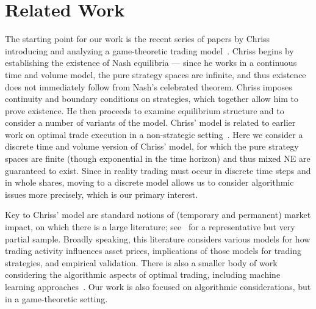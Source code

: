\section{Related Work}
The starting point for our work is the recent series of papers by Chriss introducing and analyzing a game-theoretic trading model~\citep{chriss2024optimal,chriss2024positionbuildingcompetitionrealworldconstraints,chriss2024competitiveequilibriatrading, chriss2025positionbuildingcompetitiongame}. Chriss begins by establishing the existence of Nash equilibria --- since he works in a continuous time and volume model, the pure strategy spaces are infinite, and thus existence does not immediately follow from Nash's celebrated theorem. Chriss imposes continuity and boundary conditions on strategies, which together allow him to prove existence. He then proceeds to examine equilibrium structure and to consider a number of variants of the model. 
Chriss' model is related to earlier work on optimal trade execution in a non-strategic setting~\citep{AlmgrenPortfolio}.
Here we consider a discrete time and volume version of Chriss' model, for which the pure strategy spaces are finite (though exponential in the time horizon) and thus mixed NE are guaranteed to exist. Since in reality trading must occur in discrete time steps and in whole shares, moving to a discrete model allows us to consider algorithmic issues more precisely, which is our primary interest.

Key to Chriss' model are standard notions of (temporary and permanent) market impact, on which there is a large literature;
see~\citep{Gatheral3Models,GatheralMI,Hautsch,Zarinelli,bouchaud,Webster} for a representative but very partial sample. Broadly speaking, this literature considers various models for how trading activity influences asset prices, implications of those models for trading strategies, and empirical validation. There is also a smaller body of work considering the algorithmic aspects of optimal trading, including machine learning approaches~\citep{evendarLimit,GanchevDark,nevmyvakaRL,kakadeVWAP}. Our work is also focused on algorithmic considerations, but in a game-theoretic setting.